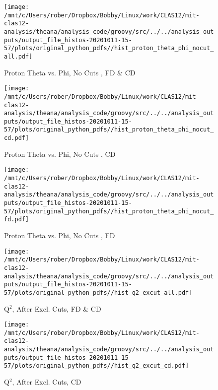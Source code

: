\documentclass{article}
\begin{document}
\begin{landscape}
    \begin{figure}[h]
        \centering

        \texttt{[image: /mnt/c/Users/rober/Dropbox/Bobby/Linux/work/CLAS12/mit-clas12-analysis/theana/analysis\_code/groovy/src/../../analysis\_outputs/output\_file\_histos-20201011-15-57/plots/original\_python\_pdfs//hist\_proton\_theta\_phi\_nocut\_all.pdf]}
        \captionsetup{textformat=empty,labelformat=blank}
        \caption{Proton Theta vs. Phi, No Cuts , FD \& CD}
    \end{figure}
    \clearpage
    
    \begin{figure}[h]
        \centering

        \texttt{[image: /mnt/c/Users/rober/Dropbox/Bobby/Linux/work/CLAS12/mit-clas12-analysis/theana/analysis\_code/groovy/src/../../analysis\_outputs/output\_file\_histos-20201011-15-57/plots/original\_python\_pdfs//hist\_proton\_theta\_phi\_nocut\_cd.pdf]}
        \captionsetup{textformat=empty,labelformat=blank}
        \caption{Proton Theta vs. Phi, No Cuts , CD}
    \end{figure}
    \clearpage
    
    \begin{figure}[h]
        \centering

        \texttt{[image: /mnt/c/Users/rober/Dropbox/Bobby/Linux/work/CLAS12/mit-clas12-analysis/theana/analysis\_code/groovy/src/../../analysis\_outputs/output\_file\_histos-20201011-15-57/plots/original\_python\_pdfs//hist\_proton\_theta\_phi\_nocut\_fd.pdf]}
        \captionsetup{textformat=empty,labelformat=blank}
        \caption{Proton Theta vs. Phi, No Cuts , FD}
    \end{figure}
    \clearpage
    
    \begin{figure}[h]
        \centering

        \texttt{[image: /mnt/c/Users/rober/Dropbox/Bobby/Linux/work/CLAS12/mit-clas12-analysis/theana/analysis\_code/groovy/src/../../analysis\_outputs/output\_file\_histos-20201011-15-57/plots/original\_python\_pdfs//hist\_q2\_excut\_all.pdf]}
        \captionsetup{textformat=empty,labelformat=blank}
        \caption{Q$^{2}$, After Excl. Cuts, FD \& CD}
    \end{figure}
    \clearpage
    
    \begin{figure}[h]
        \centering

        \texttt{[image: /mnt/c/Users/rober/Dropbox/Bobby/Linux/work/CLAS12/mit-clas12-analysis/theana/analysis\_code/groovy/src/../../analysis\_outputs/output\_file\_histos-20201011-15-57/plots/original\_python\_pdfs//hist\_q2\_excut\_cd.pdf]}
        \captionsetup{textformat=empty,labelformat=blank}
        \caption{Q$^{2}$, After Excl. Cuts, CD}
    \end{figure}
    \clearpage
    

\end{landscape}
\end{document}
